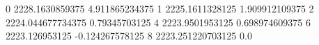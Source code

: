 0 2228.1630859375 4.911865234375
1 2225.1611328125 1.909912109375
2 2224.044677734375 0.79345703125
4 2223.9501953125 0.698974609375
6 2223.126953125 -0.124267578125
8 2223.251220703125 0.0
